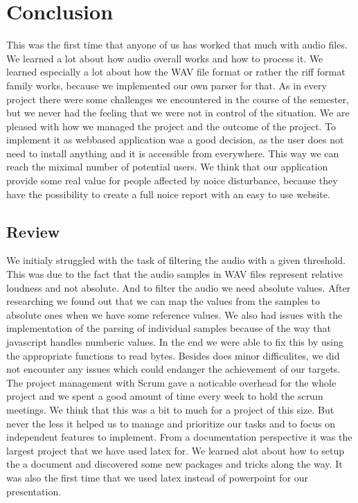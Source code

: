 \section{Conclusion}
This was the first time that anyone of us has worked that much with audio files. We learned a lot about how audio overall works and how to process it. We learned especially a lot about how the WAV file format or rather the riff format family works, because we implemented our own parser for that. As in every project there were some challenges we encountered in the course of the semester, but we never had the feeling that we were not in control of the situation. We are pleased with how we managed the project and the outcome of the project. To implement it as webbased application was a good decision, as the user does not need to install anything and it is accessible from everywhere. This way we can reach the miximal number of potential users. We think that our application provide some real value for people affected by noice disturbance, because they have the possibility to create a full noice report with an easy to use website.

\subsection{Review}
We initialy struggled with the task of filtering the audio with a given threshold. This was due to the fact that the audio samples in WAV files represent relative loudness and not absolute. And to filter the audio we need absolute values. After researching we found out that we can map the values from the samples to absolute ones when we have some reference values. 
We also had issues with the implementation of the parsing of individual samples because of the way that javascript handles numberic values. In the end we were able to fix this by using the appropriate functions to read bytes. Besides does minor difficulites, we did not encounter any issues which could endanger the achievement of our targets. 
The project management with Scrum gave a noticable overhead for the whole project and we spent a good amount of time every week to hold the scrum meetings. We think that this was a bit to much for a project of this size. But never the less it helped us to manage and prioritize our tasks and to focus on independent features to implement. 
From a documentation perspective it was the largest project that we have used latex for. We learned alot about how to setup the a document and discovered some new packages and tricks along the way. It was also the first time that we used latex instead of powerpoint for our presentation.


